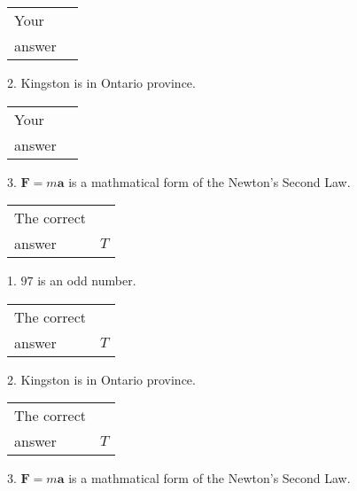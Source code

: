 \documentclass[12pt]{article}
\begin{document}
\noindent\begin{tabular}{|l|l|}\hline Your&\hspace{.2in} \\ answer&\hspace{.2in} \\ \hline \end{tabular}
2.  %
Kingston is in  %
Ontario province.
 
\noindent\begin{tabular}{|l|l|}\hline Your&\hspace{.2in} \\ answer&\hspace{.2in} \\ \hline \end{tabular}
3.  %
$\mathbf{F}=m\mathbf{a}$ is a mathmatical form of
the Newton's Second Law.
 
 
 
\noindent{}
 
 

 
\noindent\begin{tabular}{|l|l|}\hline The correct & \\
          answer &  %
$T$ \\ \hline \end{tabular}
1. $ %
97$ is an  %
odd number.
 
\noindent\begin{tabular}{|l|l|}\hline The correct & \\
          answer &  %
$T$ \\ \hline \end{tabular}
2.  %
Kingston is in  %
Ontario province.
 
\noindent\begin{tabular}{|l|l|}\hline The correct & \\
          answer &  %
$T$ \\ \hline \end{tabular}
3.  %
$\mathbf{F}=m\mathbf{a}$ is a mathmatical form of  %
the Newton's Second Law.
 
 
 
\noindent{}
 
 

 
\vspace{0.3in}
   
   
   
\end{document}
